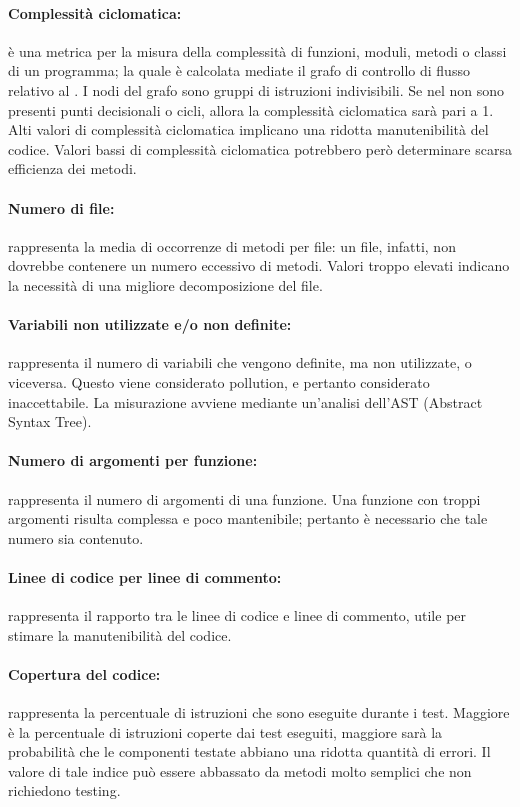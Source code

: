 \paragraph{Complessità ciclomatica:} è una metrica per la misura della complessità di funzioni, moduli, metodi o classi di un programma; la quale è calcolata mediate il grafo di controllo di flusso relativo al .
            I nodi del grafo sono gruppi di istruzioni indivisibili. Se nel  non sono presenti punti decisionali o cicli, allora la complessità ciclomatica sarà pari a 1.
            Alti valori di complessità ciclomatica implicano una ridotta manutenibilità del codice. Valori bassi di complessità ciclomatica potrebbero però determinare scarsa efficienza dei metodi.

\paragraph{Numero di file:} rappresenta la media di occorrenze di metodi per file: un file, infatti, non dovrebbe contenere un numero eccessivo di metodi. Valori troppo elevati indicano la necessità di una migliore decomposizione del file.

\paragraph{Variabili non utilizzate e/o non definite:} rappresenta il numero di variabili che vengono definite, ma non utilizzate, o viceversa. Questo viene considerato pollution, e pertanto considerato inaccettabile. La misurazione avviene mediante un’analisi dell’AST (Abstract Syntax Tree).

\paragraph{Numero di argomenti per funzione:} rappresenta il numero di argomenti di una funzione. Una funzione con troppi argomenti risulta complessa e poco mantenibile; pertanto è necessario che tale numero sia contenuto.

\paragraph{Linee di codice per linee di commento:} rappresenta il rapporto tra le linee di codice e linee di commento, utile per stimare la manutenibilità del codice.

\paragraph{Copertura del codice:} rappresenta la percentuale di istruzioni che sono eseguite durante i test. Maggiore è la percentuale di istruzioni coperte dai test eseguiti, maggiore sarà la probabilità
che le componenti testate abbiano una ridotta quantità di errori. Il valore di tale indice può essere abbassato da metodi molto semplici che non richiedono testing.
